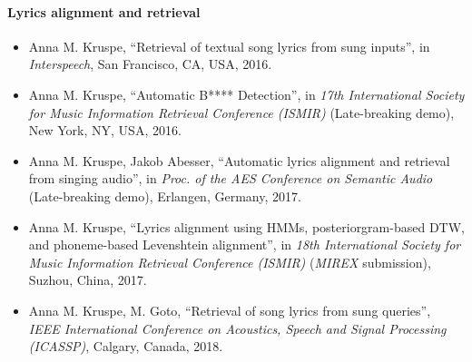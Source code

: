 \paragraph{Lyrics alignment and retrieval}
\begin{itemize}
\item Anna M. Kruspe, ``Retrieval of textual song lyrics from sung inputs'', in \textit{Interspeech}, San Francisco, CA, USA, 2016.
\item Anna M. Kruspe, ``Automatic B**** Detection'', in \textit{17th International Society for Music Information Retrieval Conference (ISMIR)} (Late-breaking demo), New York, NY, USA, 2016.
\item Anna M. Kruspe, Jakob Abesser, ``Automatic lyrics alignment and retrieval from singing audio'', in \textit{Proc. of the AES Conference on Semantic Audio} (Late-breaking demo), Erlangen, Germany, 2017.
\item Anna M. Kruspe, ``Lyrics alignment using HMMs, posteriorgram-based DTW, and phoneme-based Levenshtein alignment'', in \textit{18th International Society for Music Information Retrieval Conference (ISMIR)} (\textit{MIREX} submission), Suzhou, China, 2017.
\item Anna M. Kruspe, M. Goto, ``Retrieval of song lyrics from sung queries'', \textit{IEEE International Conference on Acoustics, Speech and Signal Processing (ICASSP)}, Calgary, Canada, 2018.
\end{itemize}

